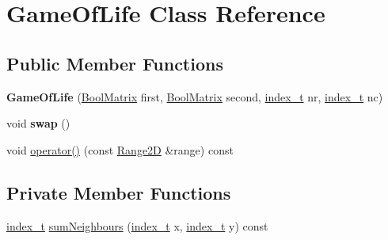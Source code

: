 \hypertarget{class_game_of_life}{
\section{GameOfLife Class Reference}
\label{class_game_of_life}
}
\subsection*{Public Member Functions}
\begin{CompactItemize}
\item 
\hypertarget{class_game_of_life_7de73dfe2060ec6d0a5bab65cf771f63}{
\textbf{GameOfLife} (\hyperlink{cowichan_8hpp_a64c8df2f1e9c8ea68a7bcc19aca683e}{BoolMatrix} first, \hyperlink{cowichan_8hpp_a64c8df2f1e9c8ea68a7bcc19aca683e}{BoolMatrix} second, \hyperlink{cowichan_8hpp_5b04577d5d21124855deaad298595371}{index\_\-t} nr, \hyperlink{cowichan_8hpp_5b04577d5d21124855deaad298595371}{index\_\-t} nc)}
\label{class_game_of_life_7de73dfe2060ec6d0a5bab65cf771f63}

\item 
\hypertarget{class_game_of_life_3027e63b5ad8a3263023f3590caf1d2e}{
void \textbf{swap} ()}
\label{class_game_of_life_3027e63b5ad8a3263023f3590caf1d2e}

\item 
void \hyperlink{class_game_of_life_dfa4429cd90a9a8a7539ecb5a4617ae8}{operator()} (const \hyperlink{cowichan__tbb_8hpp_e591b8e6980ddc5982ee22655da2ab8e}{Range2D} \&range) const 
\end{CompactItemize}
\subsection*{Private Member Functions}
\begin{CompactItemize}
\item 
\hyperlink{cowichan_8hpp_5b04577d5d21124855deaad298595371}{index\_\-t} \hyperlink{class_game_of_life_df162a0c6062460fa658ae9b9cd457b6}{sumNeighbours} (\hyperlink{cowichan_8hpp_5b04577d5d21124855deaad298595371}{index\_\-t} x, \hyperlink{cowichan_8hpp_5b04577d5d21124855deaad298595371}{index\_\-t} y) const 
\end{CompactItemize}
